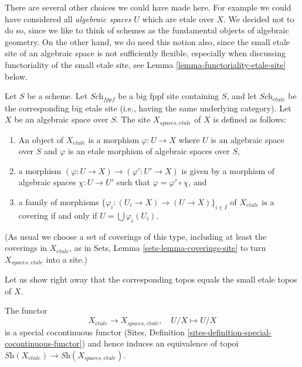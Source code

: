 \medskip\noindent
There are several other choices we could have made here. For example
we could have considered all {\it algebraic spaces} $U$ which are etale
over $X$. We decided not to do so, since we like to think of schemes as
the fundamental objects of algebraic geometry. On the other hand, we
do need this notion also, since the small etale site of an algebraic
space is not sufficiently flexible, especially when discussing functoriality
of the small etale site, see Lemma \ref{lemma-functoriality-etale-site}
below.

\begin{definition}
\label{definition-spaces-etale-site}
Let $S$ be a scheme.
Let $\textit{Sch}_{fppf}$ be a big fppf site containing $S$,
and let $\textit{Sch}_{etale}$ be the corresponding big etale site
(i.e., having the same underlying category).
Let $X$ be an algebraic space over $S$.
The site {\it $X_{spaces, etale}$} of $X$ is defined as follows:
\begin{enumerate}
\item An object of $X_{etale}$ is a morphism $\varphi : U \to X$
where $U$ is an algebraic space over $S$ and
$\varphi$ is an etale morphism of algebraic spaces over $S$,
\item a morphism $(\varphi : U \to X) \to (\varphi' : U' \to X)$
is given by a morphism of algebraic spaces $\chi : U \to U'$ such that
$\varphi = \varphi' \circ \chi$, and
\item a family of morphisms
$\{\varphi_i : (U_i \to X) \to (U \to X)\}_{i \in I}$
of $X_{etale}$ is a covering if and only if
$U = \bigcup \varphi_i(U_i)$.
\end{enumerate}
(As usual we choose a set of coverings of this type, including at least
the coverings in $X_{etale}$, as in Sets, Lemma \ref{sets-lemma-coverings-site}
to turn $X_{spaces, etale}$ into a site.)
\end{definition}

\noindent
Let us show right away that the corresponding topos equals the
small etale topos of $X$.

\begin{lemma}
\label{lemma-compare-etale-sites}
The functor
$$
X_{etale} \longrightarrow X_{spaces, etale}, \quad
U/X \longmapsto U/X
$$
is a special cocontinuous functor
(Sites, Definition \ref{sites-definition-special-cocontinuous-functor})
and hence induces an equivalence of topoi
$\textit{Sh}(X_{etale}) \to \textit{Sh}(X_{spaces, etale})$.
\end{lemma}

